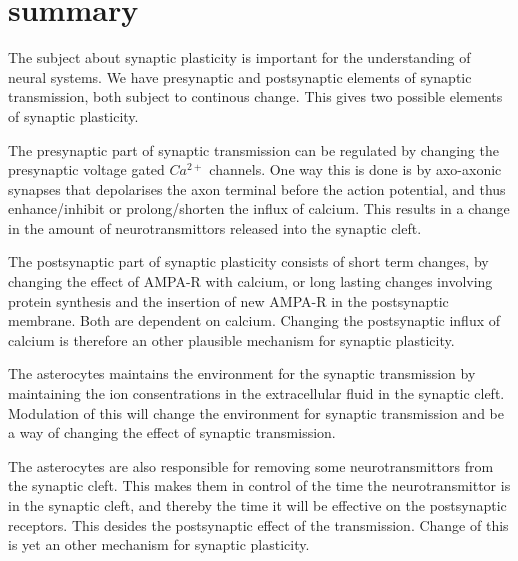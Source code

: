 \section{summary}
The subject about synaptic plasticity is important for the understanding of neural systems. 
We have presynaptic and postsynaptic elements of synaptic transmission, both subject to continous change. This gives two possible elements of synaptic plasticity. 

The presynaptic part of synaptic transmission can be regulated by changing the presynaptic voltage gated $Ca^{2+}$ channels. One way this is done is by axo-axonic synapses that depolarises the axon terminal before the action potential, and thus enhance/inhibit or prolong/shorten the influx of calcium. 
This results in a change in the amount of neurotransmittors released into the synaptic cleft.

The postsynaptic part of synaptic plasticity consists of short term changes, by changing the effect of AMPA-R with calcium, or long lasting changes involving protein synthesis and the insertion of new AMPA-R in the postsynaptic membrane. Both are dependent on calcium. Changing the postsynaptic influx of calcium is therefore an other plausible mechanism for synaptic plasticity.

The asterocytes maintains the environment for the synaptic transmission by maintaining the ion consentrations in the extracellular fluid in the synaptic cleft. 
Modulation of this will change the environment for synaptic transmission and be a way of changing the effect of synaptic transmission. 

The asterocytes are also responsible for removing some neurotransmittors from the synaptic cleft. 
This makes them in control of the time the neurotransmittor is in the synaptic cleft, and thereby the time it will be effective on the postsynaptic receptors.
This desides the postsynaptic effect of the transmission. Change of this is yet an other mechanism for synaptic plasticity.



